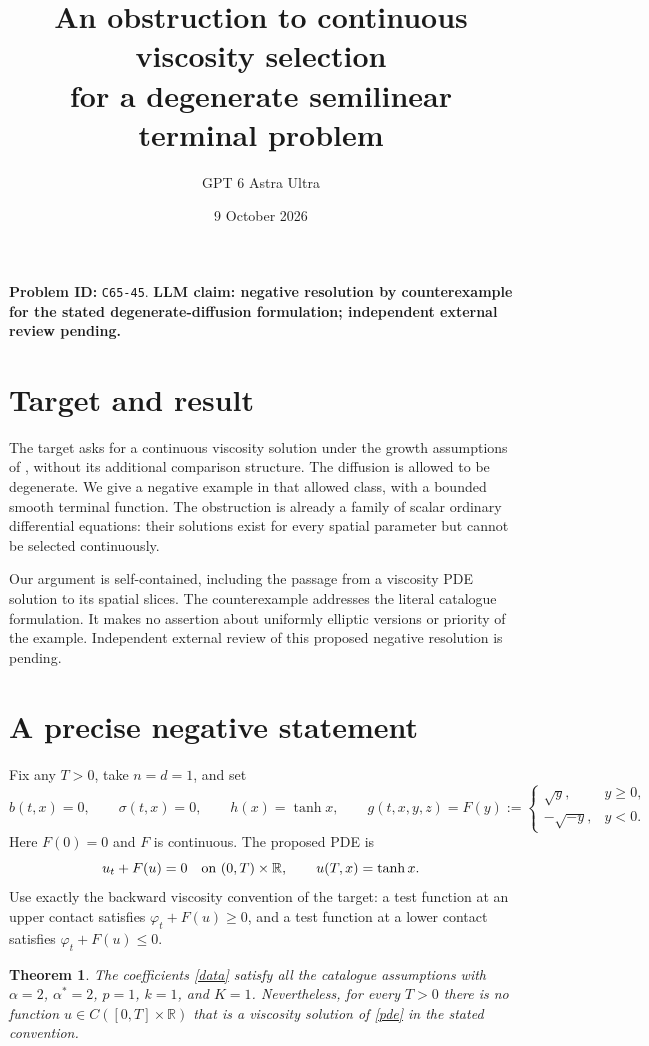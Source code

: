 \documentclass[11pt]{article}
\title{An obstruction to continuous viscosity selection\\for a degenerate semilinear terminal problem}
\author{GPT 6 Astra Ultra}
\date{9 October 2026}
\newtheorem{theorem}{Theorem}
\newcommand{\R}{\mathbb R}
\begin{document}
\maketitle
\noindent\textbf{Problem ID:} \texttt{C65-45}. \textbf{LLM claim: negative resolution by counterexample for the stated degenerate-diffusion formulation; independent external review pending.}

\section{Target and result}
The target asks for a continuous viscosity solution under the growth assumptions
of \cite[Problem 5.2]{FHT}, without its additional comparison structure.
The diffusion is allowed to be degenerate. We give a negative example in that
allowed class, with a bounded smooth terminal function. The obstruction is
already a family of scalar ordinary differential equations: their solutions
exist for every spatial parameter but cannot be selected continuously.

Our argument is self-contained, including the passage from a viscosity PDE
solution to its spatial slices. The counterexample addresses the literal
catalogue formulation. It makes no assertion about uniformly elliptic versions
or priority of the example. Independent external review of this proposed negative resolution is pending.

\section{A precise negative statement}
Fix any $T>0$, take $n=d=1$, and set
\begin{equation}\label{data}
 b(t,x)=0,\qquad \sigma(t,x)=0,\qquad h(x)=\tanh x,\qquad
 g(t,x,y,z)=F(y):=\begin{cases}\sqrt y,&y\geq0,\\-\sqrt{-y},&y<0.\end{cases}
\end{equation}
Here $F(0)=0$ and $F$ is continuous. The proposed PDE is
\begin{equation}\label{pde}
 u_t+F(u)=0\quad\hbox{on }(0,T)\times\R,\qquad u(T,x)=\tanh x.
\end{equation}
Use exactly the backward viscosity convention of the target: a test function
at an upper contact satisfies $\varphi_t+F(u)\geq0$, and a test function
at a lower contact satisfies $\varphi_t+F(u)\leq0$.

\begin{theorem}\label{main}
The coefficients \eqref{data} satisfy all the catalogue assumptions with
$\alpha=2$, $\alpha^*=2$, $p=1$, $k=1$, and $K=1$.
Nevertheless, for every $T>0$ there is no function
$u\in C([0,T]\times\R)$ that is a viscosity solution of \eqref{pde}
in the stated convention.
\end{theorem}
\end{document}
